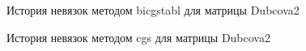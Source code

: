 \begin{figure}[H]
    \renewcommand{\figurename}{Рисунок}
    \caption{История невязок методом bicgstabl для матрицы Dubcova2}
    \label{fig:image_3}
\end{figure}

\begin{figure}[H]
    \renewcommand{\figurename}{Рисунок}
    \caption{История невязок методом cgs для матрицы Dubcova2}
    \label{fig:image_4}
\end{figure}

